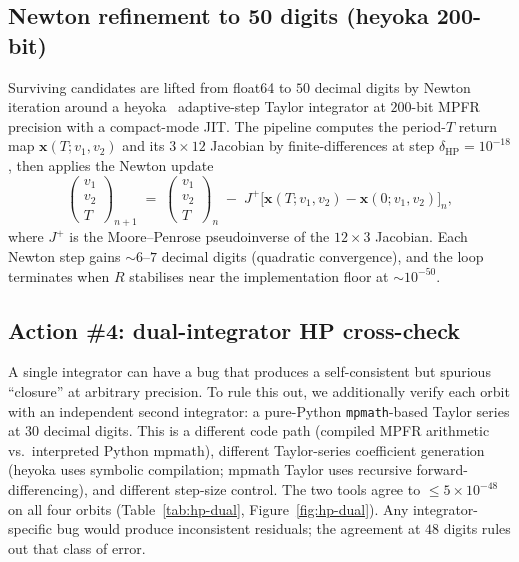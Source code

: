 \documentclass[11pt]{article}
\begin{document}
\subsection{Newton refinement to 50 digits (heyoka 200-bit)}

Surviving candidates are lifted from float64 to $50$ decimal digits by
Newton iteration around a heyoka~\citep{heyoka} adaptive-step Taylor
integrator at $200$-bit MPFR precision with a compact-mode JIT. The
pipeline computes the period-$T$ return map
$\mathbf{x}(T; v_1, v_2)$ and its $3\!\times\!12$ Jacobian by
finite-differences at step $\delta_{\text{HP}} = 10^{-18}$, then
applies the Newton update
\begin{equation}
  \begin{pmatrix} v_1 \\ v_2 \\ T \end{pmatrix}_{n+1}
  \;=\;
  \begin{pmatrix} v_1 \\ v_2 \\ T \end{pmatrix}_n
  \;-\;
  J^{+}\big[\mathbf{x}(T; v_1, v_2) - \mathbf{x}(0; v_1, v_2)\big]_n,
\end{equation}
where $J^{+}$ is the Moore--Penrose pseudoinverse of the
$12\!\times\!3$ Jacobian. Each Newton step gains $\sim\!6$--$7$
decimal digits (quadratic convergence), and the loop terminates when
$R$ stabilises near the implementation floor at $\sim\!10^{-50}$.

\subsection{Action \#4: dual-integrator HP cross-check}
\label{sec:hp-dual}

A single integrator can have a bug that produces a self-consistent
but spurious ``closure'' at arbitrary precision. To rule this out, we
additionally verify each orbit with an independent second integrator:
a pure-Python \texttt{mpmath}-based Taylor series at $30$ decimal
digits. This is a different code path (compiled MPFR arithmetic
vs.\ interpreted Python mpmath), different Taylor-series coefficient
generation (heyoka uses symbolic compilation; mpmath Taylor uses
recursive forward-differencing), and different step-size control. The
two tools agree to $\le 5\!\times\!10^{-48}$ on all four orbits
(Table~\ref{tab:hp-dual}, Figure~\ref{fig:hp-dual}). Any integrator-
specific bug would produce inconsistent residuals; the agreement at
$48$ digits rules out that class of error.
\end{document}
